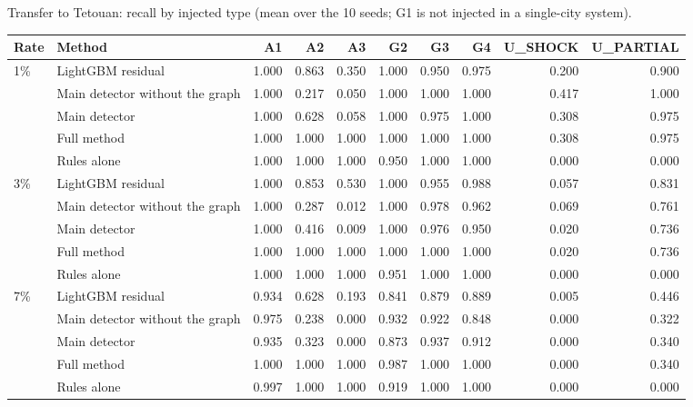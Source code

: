 \documentclass[11pt,a4paper]{article}
\makeatletter
\newenvironment{stable}{\par\addvspace{8pt}\noindent\begin{minipage}{\textwidth}\def\@captype{table}\centering}{\end{minipage}\par\addvspace{8pt}}
\makeatother
\begin{document}
\begin{stable}
\caption{Transfer to Tetouan: recall by injected type (mean over the 10 seeds; G1 is not injected in a single-city system).}\label{tab:s-tetouan-recall}
\scriptsize\setlength{\tabcolsep}{3.2pt}
\begin{tabular}{@{}l l rrrrrrrr@{}}
\toprule
Rate & Method & A1 & A2 & A3 & G2 & G3 & G4 & U\_SHOCK & U\_PARTIAL \\
\midrule
1\% & LightGBM residual & 1.000 & 0.863 & 0.350 & 1.000 & 0.950 & 0.975 & 0.200 & 0.900 \\
 & Main detector without the graph & 1.000 & 0.217 & 0.050 & 1.000 & 1.000 & 1.000 & 0.417 & 1.000 \\
 & Main detector & 1.000 & 0.628 & 0.058 & 1.000 & 0.975 & 1.000 & 0.308 & 0.975 \\
 & Full method & 1.000 & 1.000 & 1.000 & 1.000 & 1.000 & 1.000 & 0.308 & 0.975 \\
 & Rules alone & 1.000 & 1.000 & 1.000 & 0.950 & 1.000 & 1.000 & 0.000 & 0.000 \\
\midrule
3\% & LightGBM residual & 1.000 & 0.853 & 0.530 & 1.000 & 0.955 & 0.988 & 0.057 & 0.831 \\
 & Main detector without the graph & 1.000 & 0.287 & 0.012 & 1.000 & 0.978 & 0.962 & 0.069 & 0.761 \\
 & Main detector & 1.000 & 0.416 & 0.009 & 1.000 & 0.976 & 0.950 & 0.020 & 0.736 \\
 & Full method & 1.000 & 1.000 & 1.000 & 1.000 & 1.000 & 1.000 & 0.020 & 0.736 \\
 & Rules alone & 1.000 & 1.000 & 1.000 & 0.951 & 1.000 & 1.000 & 0.000 & 0.000 \\
\midrule
7\% & LightGBM residual & 0.934 & 0.628 & 0.193 & 0.841 & 0.879 & 0.889 & 0.005 & 0.446 \\
 & Main detector without the graph & 0.975 & 0.238 & 0.000 & 0.932 & 0.922 & 0.848 & 0.000 & 0.322 \\
 & Main detector & 0.935 & 0.323 & 0.000 & 0.873 & 0.937 & 0.912 & 0.000 & 0.340 \\
 & Full method & 1.000 & 1.000 & 1.000 & 0.987 & 1.000 & 1.000 & 0.000 & 0.340 \\
 & Rules alone & 0.997 & 1.000 & 1.000 & 0.919 & 1.000 & 1.000 & 0.000 & 0.000 \\
\bottomrule
\end{tabular}
\end{stable}
\end{document}
